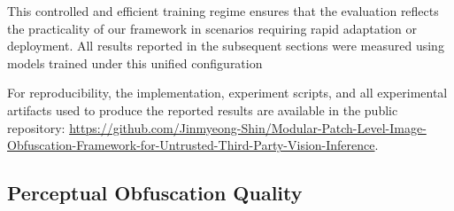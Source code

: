\documentclass{ieeeaccess}
\newcommand{\rev}[1]{{\color{green}#1}}
\begin{document}
This controlled and efficient training regime ensures that the evaluation reflects the practicality of our framework in scenarios requiring rapid adaptation or deployment. All results reported in the subsequent sections were measured using models trained under this unified configuration

\rev{For reproducibility, the implementation, experiment scripts, and all experimental artifacts used to produce the reported results are available in the public repository: \url{https://github.com/Jinmyeong-Shin/Modular-Patch-Level-Image-Obfuscation-Framework-for-Untrusted-Third-Party-Vision-Inference}.}

\subsection{Perceptual Obfuscation Quality}
\end{document}
